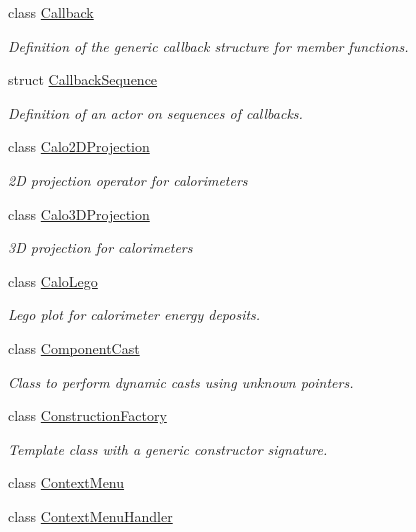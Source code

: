 \begin{DoxyCompactItemize}
class \hyperlink{class_d_d4hep_1_1_callback}{Callback}
\begin{DoxyCompactList}\small\item\em Definition of the generic callback structure for member functions. \end{DoxyCompactList}\item 
struct \hyperlink{struct_d_d4hep_1_1_callback_sequence}{Callback\+Sequence}
\begin{DoxyCompactList}\small\item\em Definition of an actor on sequences of callbacks. \end{DoxyCompactList}\item 
class \hyperlink{class_d_d4hep_1_1_calo2_d_projection}{Calo2\+D\+Projection}
\begin{DoxyCompactList}\small\item\em 2D projection operator for calorimeters \end{DoxyCompactList}\item 
class \hyperlink{class_d_d4hep_1_1_calo3_d_projection}{Calo3\+D\+Projection}
\begin{DoxyCompactList}\small\item\em 3D projection for calorimeters \end{DoxyCompactList}\item 
class \hyperlink{class_d_d4hep_1_1_calo_lego}{Calo\+Lego}
\begin{DoxyCompactList}\small\item\em Lego plot for calorimeter energy deposits. \end{DoxyCompactList}\item 
class \hyperlink{class_d_d4hep_1_1_component_cast}{Component\+Cast}
\begin{DoxyCompactList}\small\item\em Class to perform dynamic casts using unknown pointers. \end{DoxyCompactList}\item 
class \hyperlink{class_d_d4hep_1_1_construction_factory}{Construction\+Factory}
\begin{DoxyCompactList}\small\item\em Template class with a generic constructor signature. \end{DoxyCompactList}\item 
class \hyperlink{class_d_d4hep_1_1_context_menu}{Context\+Menu}
\item 
class \hyperlink{class_d_d4hep_1_1_context_menu_handler}{Context\+Menu\+Handler}

\end{DoxyCompactItemize}
